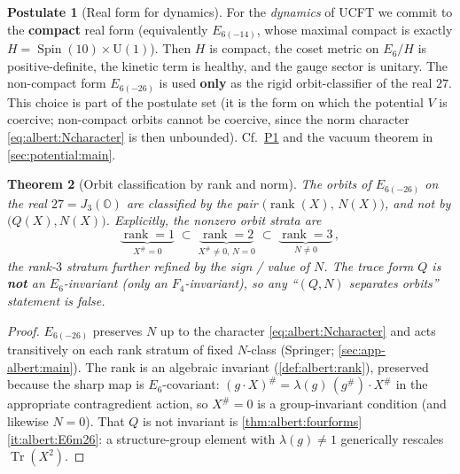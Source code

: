\documentclass[11pt]{article}
\theoremstyle{plain}
\newtheorem{theorem}{Theorem}[section]
\theoremstyle{definition}
\newtheorem{postulate}[theorem]{Postulate}
\theoremstyle{remark}
\begin{document}
\begin{postulate}[Real form for dynamics]\label{post:albert:realform}
For the \emph{dynamics} of UCFT we commit to the \textbf{compact} real
form (equivalently $E_{6(-14)}$, whose maximal compact is exactly
$H=\operatorname{Spin}(10)\times\mathrm{U}(1)$). Then $H$ is compact, the
coset metric on $E_{6}/H$ is positive-definite, the kinetic term is
healthy, and the gauge sector is unitary. The non-compact form
$E_{6(-26)}$ is used \textbf{only} as the rigid orbit-classifier of the
real $27$. This choice is part of the postulate set (it is the form on
which the potential $V$ is coercive; non-compact orbits cannot be
coercive, since the norm character \eqref{eq:albert:Ncharacter} is then
unbounded). Cf.\ \hyperref[post:potential:P1]{P1} and the vacuum theorem
in \autoref{sec:potential:main}.
\end{postulate}

\begin{theorem}[Orbit classification by rank and norm]\label{thm:albert:orbits}
\label{thm:OrbitClass}
The orbits of $E_{6(-26)}$ on the real $27=J_{3}(\mathbb{O})$ are
classified by the pair $\bigl(\operatorname{rank}(X),\,N(X)\bigr)$, and
\emph{not} by $\bigl(Q(X),N(X)\bigr)$. Explicitly, the nonzero orbit
strata are
\begin{equation}\label{eq:albert:orbitstrata}
  \underbrace{\operatorname{rank}=1}_{X^{\#}=0}\;\subset\;
  \underbrace{\operatorname{rank}=2}_{X^{\#}\neq 0,\,N=0}\;\subset\;
  \underbrace{\operatorname{rank}=3}_{N\neq 0}\,,
\end{equation}
the rank-$3$ stratum further refined by the sign / value of $N$. The
trace form $Q$ is \textbf{not} an $E_{6}$-invariant (only an
$F_{4}$-invariant), so any ``$(Q,N)$ separates orbits'' statement is
false.
\end{theorem}

\begin{proof}
$E_{6(-26)}$ preserves $N$ up to the character
\eqref{eq:albert:Ncharacter} and acts transitively on each rank stratum
of fixed $N$-class (Springer; \autoref{sec:app-albert:main}). The rank is an
algebraic invariant (\autoref{def:albert:rank}), preserved because the
sharp map is $E_{6}$-covariant: $(g\cdot X)^{\#}=\lambda(g)\,
(g^{\#})\!\cdot X^{\#}$ in the appropriate contragredient action, so
$X^{\#}=0$ is a group-invariant condition (and likewise $N=0$). That $Q$
is not invariant is \autoref{thm:albert:fourforms}\ref{it:albert:E6m26}:
a structure-group element with $\lambda(g)\neq1$ generically rescales
$\operatorname{Tr}(X^{2})$.
\end{proof}
\end{document}
